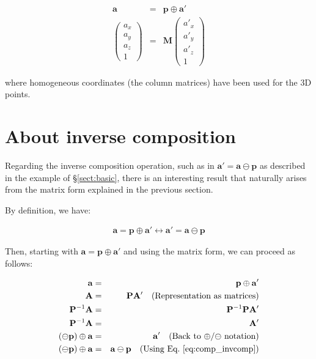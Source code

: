 \documentclass[a4paper,10pt]{report}
\begin{document}
\begin{eqnarray}
\mathbf{a} &=& \mathbf{p} \oplus \mathbf{a'} \nonumber \\
\left(\begin{array}{c}
 a_x \\ a_y \\ a_z \\ 1
\end{array}\right)
&=&
\mathbf{M} 
\left(\begin{array}{c}
 a'_x \\ a'_y \\ a'_z \\ 1
\end{array}\right)
\end{eqnarray}

\noindent where homogeneous coordinates (the column matrices) have been used for the 3D points.


\section{About inverse composition}

Regarding the inverse composition operation, such as in
$\mathbf{a'} = \mathbf{a} \ominus \mathbf{p}$ as 
described in the example of \S \ref{sect:basic}, 
there is an interesting result that naturally arises from the matrix form 
explained in the previous section.

By definition, we have:

\begin{eqnarray}
 \mathbf{a} = \mathbf{p} \oplus \mathbf{a'}   
\leftrightarrow
 \mathbf{a'} = \mathbf{a} \ominus \mathbf{p}
\label{eq:comp_invcomp}
\end{eqnarray}

Then, starting with $\mathbf{a} = \mathbf{p} \oplus \mathbf{a'}$
and using the matrix form, we can proceed as follows:

\begin{eqnarray*}
 \mathbf{a} &=& \mathbf{p} \oplus \mathbf{a'}    \\
 \mathbf{A} &=& \mathbf{P}  \mathbf{A'}  \quad \text{(Representation as matrices)}  \\
 \mathbf{P}^{-1} \mathbf{A} &=& \mathbf{P}^{-1} \mathbf{P}  \mathbf{A'} \\
 \mathbf{P}^{-1} \mathbf{A} &=& \mathbf{A'}  \\
 (\ominus \mathbf{p}) \oplus \mathbf{a} &=& \mathbf{a'}  \quad \text{(Back to $\oplus$/$\ominus$ notation)} \\
 (\ominus \mathbf{p}) \oplus \mathbf{a} &=& \mathbf{a} \ominus \mathbf{p}  \quad \text{(Using Eq.~\ref{eq:comp_invcomp})}
\end{eqnarray*}
\end{document}
